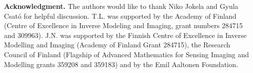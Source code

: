 \documentclass[a4paper, 10pt, twoside, notitlepage]{amsart}
\theoremstyle{plain}
\newcommand{\Om}{\Omega}
\numberwithin{equation}{section}
\newcommand {\p} {\partial}
\newcommand{\tre}{\textcolor{red}}
\newcommand{\abs}[1]{\lvert #1 \rvert}
\DeclareMathOperator{\Id} {Id}
\begin{document}




















\vskip0.5cm


\noindent\textbf{Acknowledgment.} The authors would like to thank Niko Jokela and Gyula Csat\'o for helpful discussion. 
T.L. was supported by the Academy of Finland (Centre of Excellence in Inverse Modeling and Imaging, grant numbers 284715 and 309963). J.N. was supported by the Finnish Centre of Excellence in Inverse Modelling and Imaging (Academy of Finland Grant 284715), the Research Council of Finland (Flagship of Advanced Mathematics for Sensing Imaging and Modelling grants 359208 and 359183) and by the Emil Aaltonen Foundation.





\end{document}
